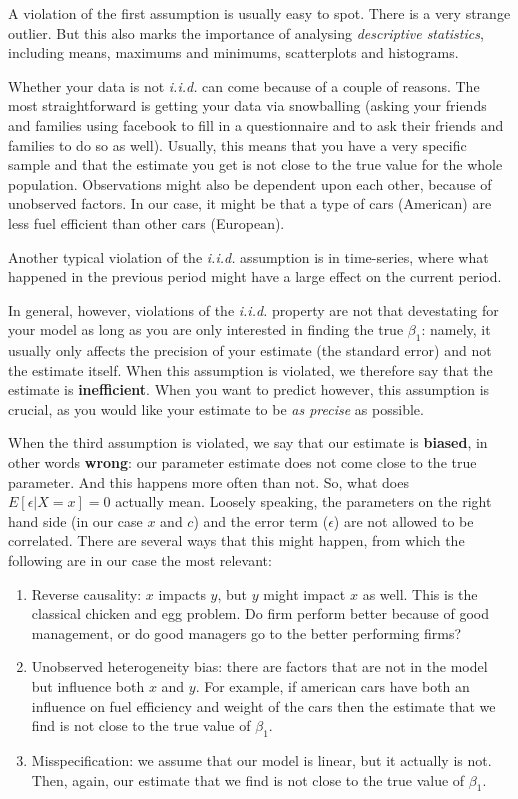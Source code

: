 \documentclass[]{article}
\begin{document}
A violation of the first assumption is usually easy to spot. There is a
very strange outlier. But this also marks the importance of analysing
\emph{descriptive statistics}, including means, maximums and minimums,
scatterplots and histograms.

Whether your data is not \emph{i.i.d.} can come because of a couple of
reasons. The most straightforward is getting your data via snowballing
(asking your friends and families using facebook to fill in a
questionnaire and to ask their friends and families to do so as well).
Usually, this means that you have a very specific sample and that the
estimate you get is not close to the true value for the whole
population. Observations might also be dependent upon each other,
because of unobserved factors. In our case, it might be that a type of
cars (American) are less fuel efficient than other cars (European).

Another typical violation of the \emph{i.i.d.} assumption is in
time-series, where what happened in the previous period might have a
large effect on the current period.

In general, however, violations of the \emph{i.i.d.} property are not
that devestating for your model as long as you are only interested in
finding the true \(\beta_1\): namely, it usually only affects the
precision of your estimate (the standard error) and not the estimate
itself. When this assumption is violated, we therefore say that the
estimate is \textbf{inefficient}. When you want to predict however, this
assumption is crucial, as you would like your estimate to be \emph{as
precise} as possible.

When the third assumption is violated, we say that our estimate is
\textbf{biased}, in other words \textbf{wrong}: our parameter estimate
does not come close to the true parameter. And this happens more often
than not. So, what does \(E[\epsilon|X=x] = 0\) actually mean. Loosely
speaking, the parameters on the right hand side (in our case \(x\) and
\(c\)) and the error term (\(\epsilon\)) are not allowed to be
correlated. There are several ways that this might happen, from which
the following are in our case the most relevant:

\begin{enumerate}
\def\labelenumi{\arabic{enumi})}
\item
  Reverse causality: \(x\) impacts \(y\), but \(y\) might impact \(x\)
  as well. This is the classical chicken and egg problem. Do firm
  perform better because of good management, or do good managers go to
  the better performing firms?
\item
  Unobserved heterogeneity bias: there are factors that are not in the
  model but influence both \(x\) and \(y\). For example, if american
  cars have both an influence on fuel efficiency and weight of the cars
  then the estimate that we find is not close to the true value of
  \(\beta_1\).
\item
  Misspecification: we assume that our model is linear, but it actually
  is not. Then, again, our estimate that we find is not close to the
  true value of \(\beta_1\).
\end{enumerate}
\end{document}
